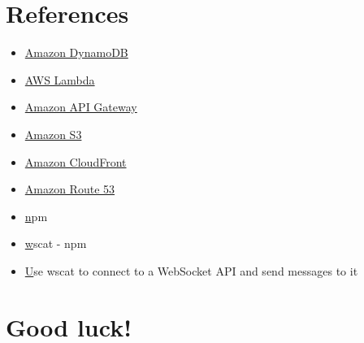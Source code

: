 \documentclass{article}
\begin{document}
\section{References}\label{references}
\begin{itemize}
  \item \href{https://docs.aws.amazon.com/amazondynamodb/latest/developerguide/Introduction.html}{Amazon DynamoDB}
  \item \href{https://docs.aws.amazon.com/lambda/latest/dg/welcome.html}{AWS Lambda}
  \item \href{https://docs.aws.amazon.com/apigateway/latest/developerguide/welcome.html}{Amazon API Gateway}
  \item \href{https://docs.aws.amazon.com/AmazonS3/latest/userguide/Welcome.html}{Amazon S3}
  \item \href{https://docs.aws.amazon.com/AmazonCloudFront/latest/DeveloperGuide/Introduction.html}{Amazon CloudFront}
  \item \href{https://docs.aws.amazon.com/Route53/latest/DeveloperGuide/Welcome.html}{Amazon Route 53}
  \item \href{https://docs.npmjs.com/downloading-and-installing-node-js-and-npm} npm
  \item \href{https://www.npmjs.com/package/wscat} wscat - npm
  \item \href{https://docs.aws.amazon.com/apigateway/latest/developerguide/apigateway-how-to-call-websocket-api-wscat.html} Use wscat to connect to a WebSocket API and send messages to it
\end{itemize}
\section*{Good luck!}
\end{document}

